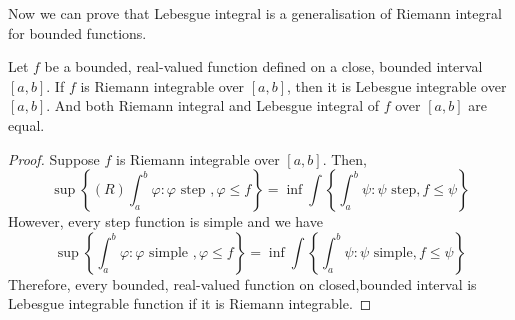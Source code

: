 Now we can prove that Lebesgue integral is a generalisation of Riemann integral for bounded functions.
\begin{theorem}
	Let $f$ be a bounded, real-valued function defined on a close, bounded interval $[a,b]$.
	If $f$ is Riemann integrable over $[a,b]$, then it is Lebesgue integrable over $[a,b]$.
	And both Riemann integral and Lebesgue integral of $f$ over $[a,b]$ are equal.
\end{theorem}
\begin{proof}
	Suppose $f$ is Riemann integrable over $[a,b]$.
	Then,
	\begin{equation} 
		\sup \left\{ (R)\int_a^b \varphi : \varphi \text{ step }, \varphi \le f \right\} = \inf \int \left\{ \int_a^b \psi : \psi \text{ step}, f \le \psi \right\}
	\end{equation}
	However, every step function is simple and  we have
	\begin{equation} 
		\sup \left\{\int_a^b \varphi : \varphi \text{ simple }, \varphi \le f \right\} = \inf \int \left\{ \int_a^b \psi : \psi \text{ simple}, f \le \psi \right\}
	\end{equation}
	Therefore, every bounded, real-valued function on closed,bounded interval is Lebesgue integrable function if it is Riemann integrable.
\end{proof}

